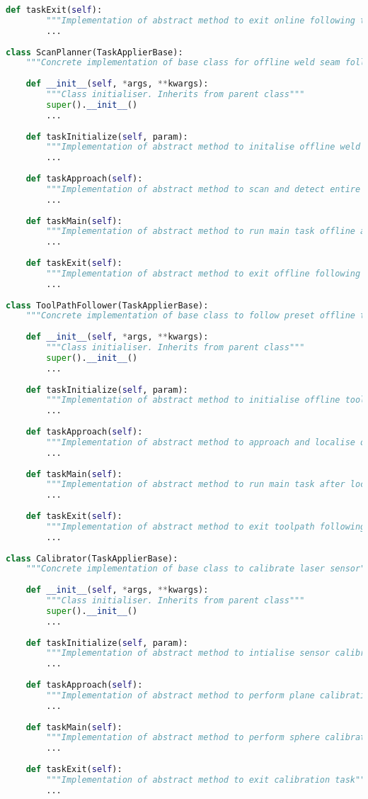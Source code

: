 \begin{lstlisting}[language=Python, columns=fullflexible, frame=single, breaklines=true, postbreak=\mbox{\textcolor{red}{$\hookrightarrow$}\space}]
	def taskExit(self):
		"""Implementation of abstract method to exit online following task"""
		...
		
class ScanPlanner(TaskApplierBase):
	"""Concrete implementation of base class for offline weld seam following"""
	
	def __init__(self, *args, **kwargs):
		"""Class initialiser. Inherits from parent class"""
		super().__init__()
		...
		
	def taskInitialize(self, param):
		"""Implementation of abstract method to initalise offline weld seam following with process parameters"""
		...
	
	def taskApproach(self):
		"""Implementation of abstract method to scan and detect entire weld seam"""
		...
		
	def taskMain(self):
		"""Implementation of abstract method to run main task offline after localising weld seam"""
		...
		
	def taskExit(self):
		"""Implementation of abstract method to exit offline following task"""
		...
		
class ToolPathFollower(TaskApplierBase):
	"""Concrete implementation of base class to follow preset offline toolpath"""
	
	def __init__(self, *args, **kwargs):
		"""Class initialiser. Inherits from parent class"""
		super().__init__()
		...
		
	def taskInitialize(self, param):
		"""Implementation of abstract method to initialise offline toolpath following with process parameters"""
		...
		
	def taskApproach(self):
		"""Implementation of abstract method to approach and localise offline toolpath"""
		...
		
	def taskMain(self):
		"""Implementation of abstract method to run main task after localising toolpath"""
		...
		
	def taskExit(self):
		"""Implementation of abstract method to exit toolpath following"""
		...
		
class Calibrator(TaskApplierBase):
	"""Concrete implementation of base class to calibrate laser sensor"""
	
	def __init__(self, *args, **kwargs):
		"""Class initialiser. Inherits from parent class"""
		super().__init__()
		...
		
	def taskInitialize(self, param):
		"""Implementation of abstract method to intialise sensor calibration with process parameters"""
		...
		
	def taskApproach(self):
		"""Implementation of abstract method to perform plane calibration of sensor"""
		...
		
	def taskMain(self):
		"""Implementation of abstract method to perform sphere calibration of sensor"""
		...
		
	def taskExit(self):
		"""Implementation of abstract method to exit calibration task"""
		...
	
\end{lstlisting}

